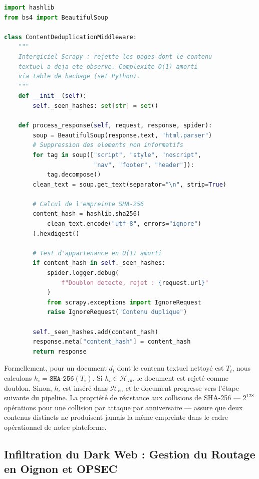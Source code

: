 \begin{lstlisting}[language=Python, caption={Intergiciel de déduplication par hachage SHA-256 avec complexité $\mathcal{O}(1)$.}, label={lst:dedup}]
import hashlib
from bs4 import BeautifulSoup

class ContentDeduplicationMiddleware:
    """
    Intergiciel Scrapy : rejette les pages dont le contenu
    textuel a deja ete observe. Complexite O(1) amorti
    via table de hachage (set Python).
    """
    def __init__(self):
        self._seen_hashes: set[str] = set()

    def process_response(self, request, response, spider):
        soup = BeautifulSoup(response.text, "html.parser")
        # Suppression des elements non informatifs
        for tag in soup(["script", "style", "noscript",
                         "nav", "footer", "header"]):
            tag.decompose()
        clean_text = soup.get_text(separator="\n", strip=True)

        # Calcul de l'empreinte SHA-256
        content_hash = hashlib.sha256(
            clean_text.encode("utf-8", errors="ignore")
        ).hexdigest()

        # Test d'appartenance en O(1) amorti
        if content_hash in self._seen_hashes:
            spider.logger.debug(
                f"Doublon detecte, rejet : {request.url}"
            )
            from scrapy.exceptions import IgnoreRequest
            raise IgnoreRequest("Contenu duplique")

        self._seen_hashes.add(content_hash)
        response.meta["content_hash"] = content_hash
        return response
\end{lstlisting}

Formellement, pour un document $d_i$ dont le contenu textuel nettoyé est $T_i$, nous calculons $h_i = \texttt{SHA-256}(T_i)$. Si $h_i \in \mathcal{H}_{\text{vu}}$, le document est rejeté comme doublon. Sinon, $h_i$ est inséré dans $\mathcal{H}_{\text{vu}}$ et le document progresse vers l'étape suivante du pipeline. La propriété de résistance aux collisions de SHA-256 --- $2^{128}$ opérations pour une collision par attaque par anniversaire --- assure que deux contenus distincts ne produisent jamais la même empreinte dans le cadre opérationnel de notre plateforme.

\subsection{Infiltration du Dark Web : Gestion du Routage en Oignon et OPSEC}

